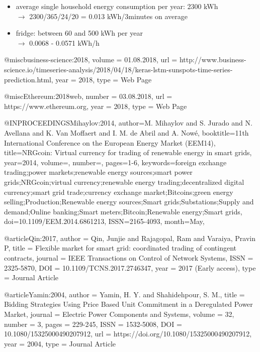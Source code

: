 


\begin{itemize}
    \item average single household energy consumption per year: 2300 kWh \\
    $\xrightarrow{}$ 2300/365/24/20 = 0.013 kWh/3minutes on average
    \item fridge: between 60 and 500 kWh per year\\
    $\xrightarrow{}$ 0.0068 - 0.0571 kWh/h
\end{itemize}



@misc{business-science:2018,
   volume = {01.08.2018},
   url = {http://www.business-science.io/timeseries-analysis/2018/04/18/keras-lstm-sunspots-time-series-prediction.html},
   year = {2018},
   type = {Web Page}
}


@misc{Ethereum:2018web,
   number = {03.08.2018},
   url = {https://www.ethereum.org},
   year = {2018},
   type = {Web Page}
}



@INPROCEEDINGS{Mihaylov:2014, 
author={M. Mihaylov and S. Jurado and N. Avellana and K. Van Moffaert and I. M. de Abril and A. Nowé}, 
booktitle={11th International Conference on the European Energy Market (EEM14)}, 
title={NRGcoin: Virtual currency for trading of renewable energy in smart grids}, 
year={2014}, 
volume={}, 
number={}, 
pages={1-6}, 
keywords={foreign exchange trading;power markets;renewable energy sources;smart power grids;NRGcoin;virtual currency;renewable energy trading;decentralized digital currency;smart grid trade;currency exchange market;Bitcoins;green energy selling;Production;Renewable energy sources;Smart grids;Substations;Supply and demand;Online banking;Smart meters;Bitcoin;Renewable energy;Smart grids}, 
doi={10.1109/EEM.2014.6861213}, 
ISSN={2165-4093}, 
month={May},}


@article{Qin:2017,
   author = {Qin, Junjie and Rajagopal, Ram and Varaiya, Pravin P},
   title = {Flexible market for smart grid: coordinated trading of contingent contracts},
   journal = {IEEE Transactions on Control of Network Systems},
   ISSN = {2325-5870},
   DOI = {10.1109/TCNS.2017.2746347},
   year = {2017 (Early access)},
   type = {Journal Article}
}


@article{Yamin:2004,
   author = {Yamin, H. Y. and Shahidehpour, S. M.},
   title = {Bidding Strategies Using Price Based Unit Commitment in a Deregulated Power Market},
   journal = {Electric Power Components and Systems},
   volume = {32},
   number = {3},
   pages = {229-245},
   ISSN = {1532-5008},
   DOI = {10.1080/15325000490207912},
   url = {https://doi.org/10.1080/15325000490207912},
   year = {2004},
   type = {Journal Article}
}



